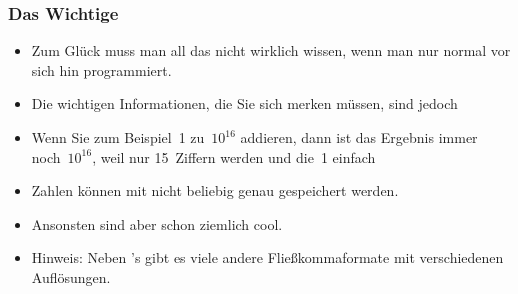 \documentclass[aspectratio=169,mathserif,notheorems]{beamer}%
\begin{document}
%
\begin{frame}%
\frametitle{Das Wichtige}%
\begin{itemize}%
\item Zum Glück muss man all das nicht wirklich wissen, wenn man nur normal vor sich hin programmiert.%
\item<2-> Die wichtigen Informationen, die Sie sich merken müssen, sind jedoch
%
\item<7-> Wenn Sie zum Beispiel~1 zu~$10^{16}$ addieren, dann ist das Ergebnis immer noch~$10^{16}$, weil nur 15~Ziffern  werden und die~1 einfach %
%
\item<8-> \alert{Zahlen können mit  nicht beliebig genau gespeichert werden\cite{PSF:P3D:TPT:FPAIAL}.}%
\item<9-> Ansonsten sind  aber schon ziemlich cool.%
\item<10-> Hinweis: Neben \python's  gibt es viele andere Fließkommaformate mit verschiedenen Auflösungen\cite{IEEE2019ISFFPA,G1991WECSSKAFPA}.
\end{itemize}%
\end{frame}%
%
\end{document}

